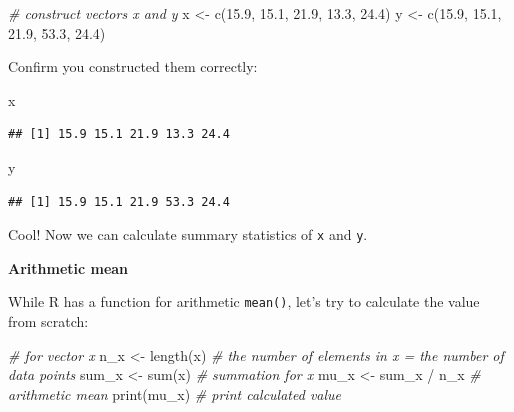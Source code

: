 \documentclass[
]{book}
\newenvironment{Shaded}{\begin{snugshade}}{\end{snugshade}}
\newcommand{\CommentTok}[1]{\textcolor[rgb]{0.56,0.35,0.01}{\textit{#1}}}
\newcommand{\FloatTok}[1]{\textcolor[rgb]{0.00,0.00,0.81}{#1}}
\newcommand{\FunctionTok}[1]{\textcolor[rgb]{0.00,0.00,0.00}{#1}}
\newcommand{\NormalTok}[1]{#1}
\newcommand{\OtherTok}[1]{\textcolor[rgb]{0.56,0.35,0.01}{#1}}
\newcommand{\SpecialCharTok}[1]{\textcolor[rgb]{0.00,0.00,0.00}{#1}}
\begin{document}
\begin{Shaded}
\begin{Highlighting}[]
\CommentTok{\# construct vectors x and y}
\NormalTok{x }\OtherTok{\textless{}{-}} \FunctionTok{c}\NormalTok{(}\FloatTok{15.9}\NormalTok{, }\FloatTok{15.1}\NormalTok{, }\FloatTok{21.9}\NormalTok{, }\FloatTok{13.3}\NormalTok{, }\FloatTok{24.4}\NormalTok{)}
\NormalTok{y }\OtherTok{\textless{}{-}} \FunctionTok{c}\NormalTok{(}\FloatTok{15.9}\NormalTok{, }\FloatTok{15.1}\NormalTok{, }\FloatTok{21.9}\NormalTok{, }\FloatTok{53.3}\NormalTok{, }\FloatTok{24.4}\NormalTok{)}
\end{Highlighting}
\end{Shaded}

Confirm you constructed them correctly:

\begin{Shaded}
\begin{Highlighting}[]
\NormalTok{x}
\end{Highlighting}
\end{Shaded}

\begin{verbatim}
## [1] 15.9 15.1 21.9 13.3 24.4
\end{verbatim}

\begin{Shaded}
\begin{Highlighting}[]
\NormalTok{y}
\end{Highlighting}
\end{Shaded}

\begin{verbatim}
## [1] 15.9 15.1 21.9 53.3 24.4
\end{verbatim}

Cool! Now we can calculate summary statistics of \texttt{x} and \texttt{y}.

\textbf{Arithmetic mean}

While R has a function for arithmetic \texttt{mean()}, let's try to calculate the value from scratch:

\begin{Shaded}
\begin{Highlighting}[]
\CommentTok{\# for vector x}
\NormalTok{n\_x }\OtherTok{\textless{}{-}} \FunctionTok{length}\NormalTok{(x) }\CommentTok{\# the number of elements in x = the number of data points}
\NormalTok{sum\_x }\OtherTok{\textless{}{-}} \FunctionTok{sum}\NormalTok{(x) }\CommentTok{\# summation for x}
\NormalTok{mu\_x }\OtherTok{\textless{}{-}}\NormalTok{ sum\_x }\SpecialCharTok{/}\NormalTok{ n\_x }\CommentTok{\# arithmetic mean}
\FunctionTok{print}\NormalTok{(mu\_x) }\CommentTok{\# print calculated value}
\end{Highlighting}
\end{Shaded}
\end{document}
